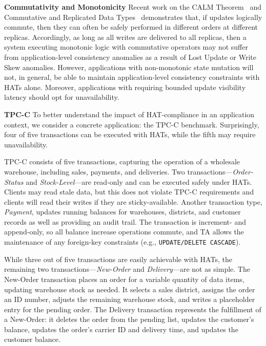 \vspace{.5em}\noindent\textbf{Commutativity and Monotonicity} Recent
work on the CALM Theorem~\cite{calm} and Commutative and Replicated Data
Types~\cite{crdt} demonstrates that, if updates logically commute,
then they can often be safely performed in different orders at
different replicas. Accordingly, as long as all writes are delivered
to all replicas, then a system executing monotonic logic with
commutative operators may not suffer from application-level
consistency anomalies as a result of Lost Update or Write Skew
anomalies. However, applications with non-monotonic state mutation
will not, in general, be able to maintain application-level
consistency constraints with HATs alone. Moreover, applications with
requiring bounded update visibility latency should opt for
unavailability.

\vspace{.5em}\noindent\textbf{TPC-C} To better understand the impact
of HAT-compliance in an application context, we consider a concrete
application: the TPC-C benchmark. Surprisingly, four of five
transactions can be executed with HATs, while the fifth may require
unavailability.

TPC-C consists of five transactions, capturing the operation of a
wholesale warehouse, including sales, payments, and deliveries. Two
transactions---\textit{Order-Status} and \textit{Stock-Level}---are
read-only and can be executed safely under HATs. Clients may read
stale data, but this does not violate TPC-C requirements and clients
will read their writes if they are sticky-available. Another
transaction type, \textit{Payment}, updates running balances for
warehouses, districts, and customer records as well as providing an
audit trail. The transaction is increment- and append-only, so all
balance increase operations commute, and TA allows the
maintenance of any foreign-key constraints (e.g.,
\texttt{UPDATE/DELETE CASCADE}).

While three out of five transactions are easily achievable with
HATs, the remaining two transactions---\textit{New-Order} and
\textit{Delivery}---are not as simple. The New-Order transaction
places an order for a variable quantity of data items, updating
warehouse stock as needed. It selects a sales district, assigns the
order an ID number, adjusts the remaining warehouse stock, and writes
a placeholder entry for the pending order. The Delivery transaction
represents the fulfillment of a New-Order: it deletes the order from
the pending list, updates the customer's balance, updates the order's
carrier ID and delivery time, and updates the customer balance.

